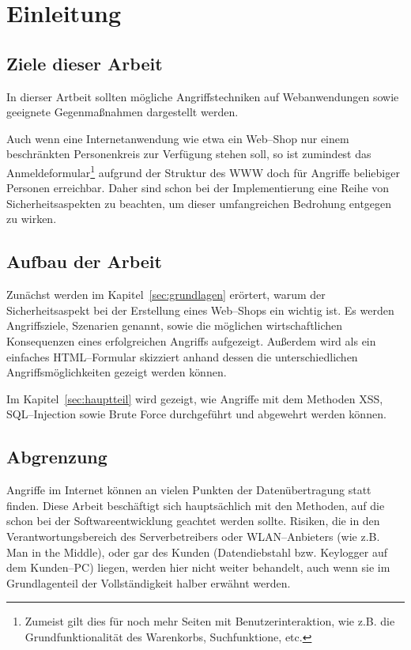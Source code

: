 \section{Einleitung}
\label{sec:einleitung}


\subsection{Ziele dieser Arbeit}

In dierser Artbeit sollten mögliche Angriffstechniken auf Webanwendungen 
sowie geeignete Gegenmaßnahmen dargestellt werden.

Auch wenn eine Internetanwendung wie etwa ein Web--Shop nur einem beschränkten Personenkreis zur Verfügung stehen soll,
so ist zumindest das Anmeldeformular\footnote{Zumeist gilt dies für noch mehr Seiten mit Benutzerinteraktion, wie z.B. die Grundfunktionalität des Warenkorbs, Suchfunktione, etc.} aufgrund der Struktur des \ac{WWW} doch für Angriffe beliebiger Personen erreichbar.
Daher sind schon bei der Implementierung eine Reihe von Sicherheitsaspekten zu beachten, um dieser umfangreichen Bedrohung entgegen zu wirken.

\subsection{Aufbau der Arbeit}

Zunächst werden im Kapitel~\ref{sec:grundlagen} erörtert, warum der Sicherheitsaspekt bei der Erstellung eines Web–Shops ein wichtig ist. Es werden Angriffsziele, Szenarien genannt, sowie die möglichen wirtschaftlichen Konsequenzen eines erfolgreichen Angriffs aufgezeigt. Außerdem wird als ein einfaches HTML--Formular skizziert anhand dessen die unterschiedlichen Angriffsmöglichkeiten gezeigt werden können.

Im Kapitel~\ref{sec:hauptteil} wird gezeigt, wie Angriffe mit dem Methoden \ac{XSS}, SQL--Injection sowie Brute Force durchgeführt und abgewehrt werden können.

\subsection{Abgrenzung}

Angriffe im Internet können an vielen Punkten der Datenübertragung statt finden. Diese Arbeit beschäftigt sich hauptsächlich mit den Methoden, auf die schon bei der Softwareentwicklung geachtet werden sollte. Risiken, die in den Verantwortungsbereich des Serverbetreibers oder WLAN--Anbieters (wie z.B. Man in the Middle), oder gar des Kunden (Datendiebstahl bzw. Keylogger auf dem Kunden--PC) liegen, werden hier nicht weiter behandelt, auch wenn sie im Grundlagenteil der Vollständigkeit halber erwähnt werden.